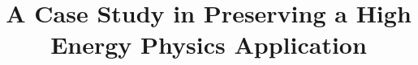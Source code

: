 \documentclass{acm_proc_article-sp}
\begin{document}
\title{A Case Study in Preserving a High Energy Physics Application}
%
%
%
%
%
\end{document}
